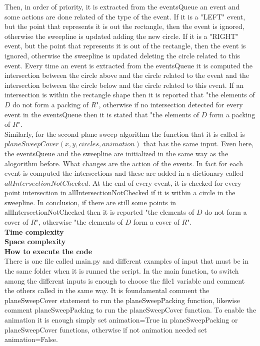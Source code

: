 \documentclass[12pt]{article}
\begin{document}
\noindent Then, in order of priority, it is extracted from the eventsQueue an event and some actions are done related of the type of the event. If it is a "LEFT" event, but the point that represents it is out the rectangle, then the event is ignored, otherwise the sweepline is updated adding the new circle. If it is a "RIGHT" event, but the point that represents it is out of the rectangle, then the event is ignored, otherwise the sweepline is updated deleting the circle related to this event. Every time an event is extracted from the eventsQueue it is computed the intersection between the circle above and the circle related to the event and the intersection between the circle below and the circle related to this event. If an intersection is within the rectangle shape then it is reported that "the elements of $D$ do not form a packing of $R$", otherwise if no intersection detected for every event in the eventsQueue then it is stated that "the elements of $D$ form a packing of $R$". \\

\noindent Similarly, for the second plane sweep algorithm the function that it is called is $planeSweepCover(x, y, circles, animation)$ that has the same input. Even here, the eventsQueue and the sweepline are initialized in the same way as the alogorithm before. What changes are the action of the  events. In fact for each event is computed the intersections and these are added in a dictionary called $allIntersectionNotChecked$. At the end of every event, it is checked for every point intersection in allIntersectionNotChecked if it is within a circle in the sweepline. In conclusion, if there are still some points in allIntersectionNotChecked then it is reported "the elements of $D$ do not form a cover of $R$", otherwise "the elements of $D$ form a cover of $R$". \\


\noindent \textbf{Time complexity}\\

\noindent \textbf{Space complexity}\\

\noindent \textbf{How to execute the code}\\
There is one file called main.py and different examples of input that must be in the same folder when it is runned the script. In the main function, to switch among the different inputs is enough to choose the file1 variable and comment the others called in the same way. It is foundamental comment the planeSweepCover statement to run the planeSweepPacking function, likewise comment planeSweepPacking to run the planeSweepCover function. To enable the animation it is enough simply set animation=True in planeSweepPacking or planeSweepCover functions, otherwise if not animation needed set animation=False.
\end{document}

